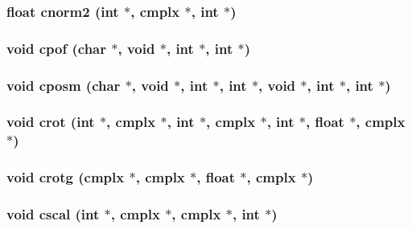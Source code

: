 \subsubsection{\setlength{\rightskip}{0pt plus 5cm}float cnorm2 (int $\ast$, {\bf cmplx} $\ast$, int $\ast$)}\label{essl_8h_6a941202e984707be730e7b8c230768c}


\subsubsection{\setlength{\rightskip}{0pt plus 5cm}void cpof (char $\ast$, void $\ast$, int $\ast$, int $\ast$)}\label{essl_8h_b98eae8c0147fa1690923ab5069c33c4}


\subsubsection{\setlength{\rightskip}{0pt plus 5cm}void cposm (char $\ast$, void $\ast$, int $\ast$, int $\ast$, void $\ast$, int $\ast$, int $\ast$)}\label{essl_8h_1261ba99773d1487c2a0301af1aca661}


\subsubsection{\setlength{\rightskip}{0pt plus 5cm}void crot (int $\ast$, {\bf cmplx} $\ast$, int $\ast$, {\bf cmplx} $\ast$, int $\ast$, float $\ast$, {\bf cmplx} $\ast$)}\label{essl_8h_682329bfc2663b9b1310d7774a34dce0}


\subsubsection{\setlength{\rightskip}{0pt plus 5cm}void crotg ({\bf cmplx} $\ast$, {\bf cmplx} $\ast$, float $\ast$, {\bf cmplx} $\ast$)}\label{essl_8h_ac90ea044aa18a8d0e8c1c08090cd47b}


\subsubsection{\setlength{\rightskip}{0pt plus 5cm}void cscal (int $\ast$, {\bf cmplx} $\ast$, {\bf cmplx} $\ast$, int $\ast$)}\label{essl_8h_34bbe383e12022835ab6ccf66f617226}


